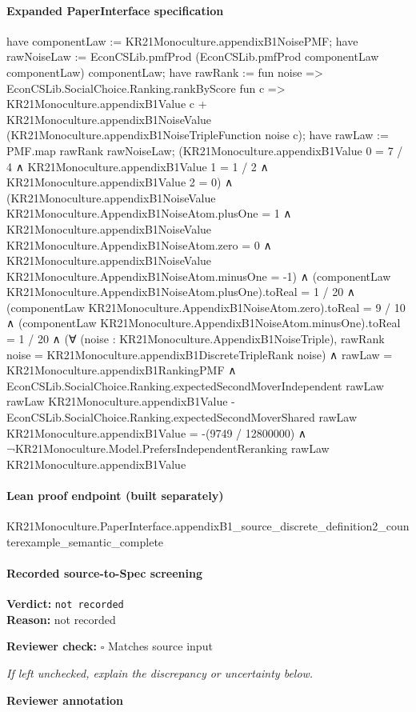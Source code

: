 \documentclass[10pt]{article}
\newcommand{\reviewerbox}{%
  \par\noindent\fbox{\parbox{0.96\linewidth}{\rule{0pt}{0.38in}}}\par
}
\newcommand{\reviewmatch}[1]{%
  \par\noindent\textbf{Reviewer check:} $\square$\; #1\par
  \noindent\emph{If left unchecked, explain the discrepancy or uncertainty below.}\par
}
\begin{document}
\paragraph{Expanded PaperInterface specification}
\begin{ReviewVerbatim}
have componentLaw := KR21Monoculture.appendixB1NoisePMF;
have rawNoiseLaw := EconCSLib.pmfProd (EconCSLib.pmfProd componentLaw componentLaw) componentLaw;
have rawRank := fun noise =>
  EconCSLib.SocialChoice.Ranking.rankByScore fun c =>
    KR21Monoculture.appendixB1Value c +
      KR21Monoculture.appendixB1NoiseValue (KR21Monoculture.appendixB1NoiseTripleFunction noise c);
have rawLaw := PMF.map rawRank rawNoiseLaw;
(KR21Monoculture.appendixB1Value 0 = 7 / 4 ∧
    KR21Monoculture.appendixB1Value 1 = 1 / 2 ∧ KR21Monoculture.appendixB1Value 2 = 0) ∧
  (KR21Monoculture.appendixB1NoiseValue KR21Monoculture.AppendixB1NoiseAtom.plusOne = 1 ∧
      KR21Monoculture.appendixB1NoiseValue KR21Monoculture.AppendixB1NoiseAtom.zero = 0 ∧
        KR21Monoculture.appendixB1NoiseValue KR21Monoculture.AppendixB1NoiseAtom.minusOne = -1) ∧
    (componentLaw KR21Monoculture.AppendixB1NoiseAtom.plusOne).toReal = 1 / 20 ∧
      (componentLaw KR21Monoculture.AppendixB1NoiseAtom.zero).toReal = 9 / 10 ∧
        (componentLaw KR21Monoculture.AppendixB1NoiseAtom.minusOne).toReal = 1 / 20 ∧
          (∀ (noise : KR21Monoculture.AppendixB1NoiseTriple),
              rawRank noise = KR21Monoculture.appendixB1DiscreteTripleRank noise) ∧
            rawLaw = KR21Monoculture.appendixB1RankingPMF ∧
              EconCSLib.SocialChoice.Ranking.expectedSecondMoverIndependent rawLaw rawLaw
                      KR21Monoculture.appendixB1Value -
                    EconCSLib.SocialChoice.Ranking.expectedSecondMoverShared rawLaw KR21Monoculture.appendixB1Value =
                  -(9749 / 12800000) ∧
                ¬KR21Monoculture.Model.PrefersIndependentReranking rawLaw KR21Monoculture.appendixB1Value
\end{ReviewVerbatim}

\paragraph{Lean proof endpoint (built separately)}\begin{ReviewVerbatim}
KR21Monoculture.PaperInterface.appendixB1_source_discrete_definition2_counterexample_semantic_complete
\end{ReviewVerbatim}

\paragraph{Recorded source-to-Spec screening}
\textbf{Verdict:} \texttt{not recorded}
\\
\textbf{Reason:} not recorded
\reviewmatch{Matches source input}
\noindent\textbf{Reviewer annotation}\par
\reviewerbox
\clearpage
\hypertarget{source-claim-8c4914b3b2e7a592}{}
\end{document}
